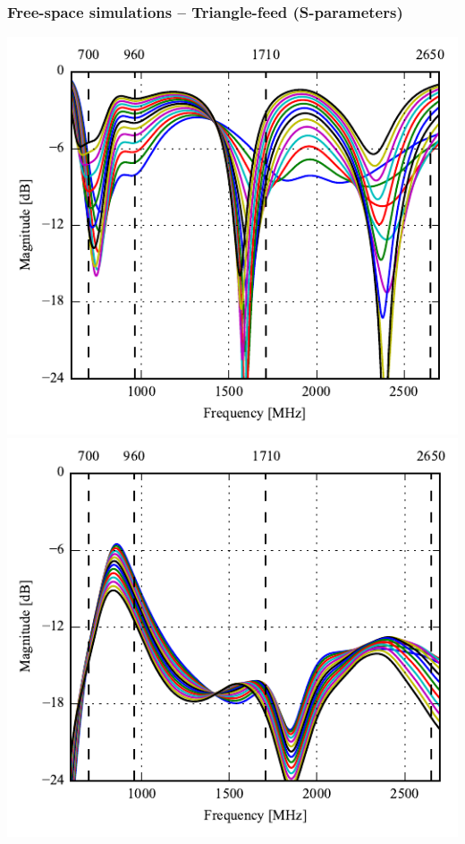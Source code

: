 \begin{frame}
    \frametitle{Free-space simulations -- Triangle-feed (S-parameters)}
    \vspace*{-0.5cm}
  \begin{minipage}[t]{0.49\linewidth}
    \vspace{0mm}

    \includegraphics[width=0.78\linewidth]{img/henrik/triag/Csh1s11.pdf} \\
    \includegraphics[width=0.78\linewidth]{img/henrik/triag/Csh1s21.pdf} 

  \end{minipage}\hfill       
  \begin{minipage}[t]{0.49\linewidth}
    \vspace{0 mm}


\end{minipage}
\end{frame}
